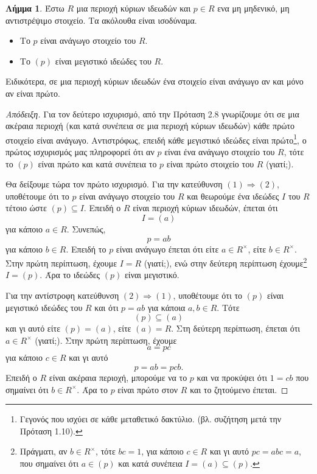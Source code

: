 \documentclass[12pt,a4paper,reqno]{amsart}
\theoremstyle{definition}
\newtheorem{lemma}[theorem]{Λήμμα}
\theoremstyle{remark}
\numberwithin{theorem}{section}
\numberwithin{exercise}{section}
\numberwithin{equation}{section}
\newcommand{\then}{\Rightarrow}
\begin{document}
\begin{lemma}
    \label{lem:in_PIDs_irreducible_equals_prime}
    Έστω $R$ μια περιοχή κύριων ιδεωδών και $p \in R$ ενα μη μηδενικό, μη αντιστρέψιμο στοιχείο. Τα ακόλουθα είναι ισοδύναμα.
    \begin{itemize}
        \item[(1)] Το $p$ είναι ανάγωγο στοιχείο του $R$.
        \item[(2)] Το $(p)$ είναι μεγιστικό ιδεώδες του $R$.
    \end{itemize}
    Ειδικότερα, σε μια περιοχή κύριων ιδεωδών ένα στοιχείο είναι ανάγωγο αν και μόνο αν είναι πρώτο.
\end{lemma}

\begin{proof}[Απόδειξη]
    Για τον δεύτερο ισχυρισμό, από την Πρόταση 2.8 γνωρίζουμε ότι σε μια ακέραια περιοχή (και κατά συνέπεια σε μια περιοχή κύριων ιδεωδών) κάθε πρώτο στοιχείο είναι ανάγωγο. Αντιστρόφως, επειδή κάθε μεγιστικό ιδεώδες είναι πρώτο\footnote{Γεγονός που ισχύει σε κάθε μεταθετικό δακτύλιο. (βλ. συζήτηση μετά την Πρόταση 1.10).}, ο πρώτος ισχυρισμός μας πληροφορεί ότι αν $p$ είναι ένα ανάγωγο στοιχείο του $R$, τότε το $(p)$ είναι πρώτο και κατά συνέπεια το $p$ είναι πρώτο στοιχείο του $R$ (γιατί;).

    Θα δείξουμε τώρα τον πρώτο ισχυρισμό. Για την κατεύθυνση $(1) \then (2)$, υποθέτουμε ότι το $p$ είναι ανάγωγο στοιχείο του $R$ και θεωρούμε ένα ιδεώδες $I$ του $R$ τέτοιο ώστε $(p) \subseteq I$. Επειδή ο $R$ είναι περιοχή κύριων ιδεωδών, έπεται ότι 
    \[
    I = (a)
    \]
    για κάποιο $a \in R$. Συνεπώς, 
    \[
    p = ab
    \]
    για κάποιο $b \in R$. Επειδή το $p$ είναι ανάγωγο έπεται ότι είτε $a \in R^\times$, είτε $b \in R^\times$. Στην πρώτη περίπτωση, έχουμε $I=R$ (γιατί;), ενώ στην δεύτερη περίπτωση έχουμε\footnote{Πράγματι, αν $b \in R^\times$, τότε $bc = 1$, για κάποιο $c \in R$ και γι αυτό $pc = abc = a$, που σημαίνει ότι $a \in (p)$ και κατά συνέπεια $I = (a) \subseteq (p)$.} $I = (p)$. Άρα το ιδεώδες $(p)$ είναι μεγιστικό.

    Για την αντίστροφη κατεύθυνση $(2) \then (1)$, υποθέτουμε ότι το $(p)$ είναι μεγιστικό ιδεώδες του $R$ και ότι $p = ab$ για κάποια $a, b \in R$. Τότε 
    \[
    (p) \subseteq (a) 
    \]
    και γι αυτό είτε $(p) = (a)$, είτε $(a) = R$. Στη δεύτερη περίπτωση, έπεται ότι $a \in R^\times$ (γιατί;). Στην πρώτη περίπτωση, έχουμε 
    \[
    a = pc
    \]
    για κάποιο $c \in R$ και γι αυτό 
    \[
    p = ab = pcb.
    \]
    Επειδή ο $R$ είναι ακέραια περιοχή, μπορούμε να  το $p$ και να προκύψει ότι $1 = cb$ που σημαίνει ότι $b \in R^\times$. Άρα το $p$ είναι πρώτο στον $R$ και το ζητούμενο έπεται.
\end{proof}
\end{document}
